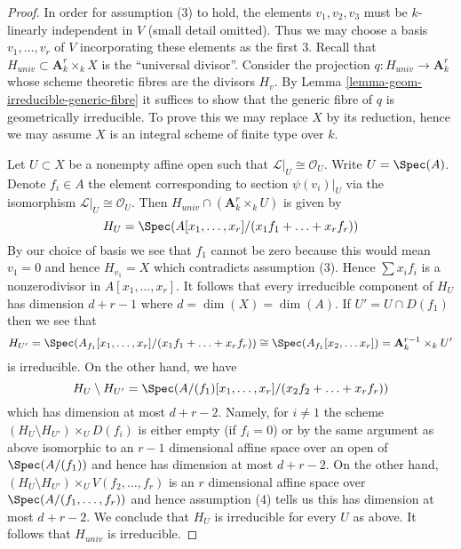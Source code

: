 \begin{proof}
In order for assumption (3) to hold, the elements $v_1, v_2, v_3$
must be $k$-linearly independent in $V$ (small detail omitted).
Thus we may choose a basis $v_1, \ldots, v_r$ of $V$ incorporating
these elements as the first $3$. Recall that
$H_{univ} \subset \mathbf{A}^r_k \times_k X$ is the ``universal divisor''.
Consider the projection $q : H_{univ} \to \mathbf{A}^r_k$
whose scheme theoretic fibres are the divisors $H_v$. By
Lemma \ref{lemma-geom-irreducible-generic-fibre}
it suffices to show that the generic fibre of $q$ is geometrically
irreducible.
To prove this we may replace $X$ by its reduction, hence
we may assume $X$ is an integral scheme of finite type over $k$.

\medskip\noindent
Let $U \subset X$ be a nonempty affine open such that
$\mathcal{L}|_U \cong \mathcal{O}_U$. Write $U = \Spec(A)$.
Denote $f_i \in A$ the element corresponding to section $\psi(v_i)|_U$
via the isomorphism $\mathcal{L}|_U \cong \mathcal{O}_U$.
Then $H_{univ} \cap (\mathbf{A}^r_k \times_k U)$ is given by
$$
H_U = \Spec(A[x_1, \ldots, x_r]/(x_1f_1 + \ldots + x_rf_r))
$$
By our choice of basis we see that $f_1$ cannot be zero because this
would mean $v_1 = 0$ and hence $H_{v_1} = X$ which contradicts
assumption (3). Hence $\sum x_if_i$ is a nonzerodivisor in
$A[x_1, \ldots, x_r]$.
It follows that every irreducible component of $H_U$ has dimension
$d + r - 1$ where $d = \dim(X) = \dim(A)$. If $U' = U \cap D(f_1)$
then we see that
$$
H_{U'} =
\Spec(A_{f_1}[x_1, \ldots, x_r]/(x_1f_1 + \ldots + x_rf_r)) \cong
\Spec(A_{f_1}[x_2, \ldots x_r]) =
\mathbf{A}^{r - 1}_k \times_k U'
$$
is irreducible. On the other hand, we have
$$
H_U \setminus H_{U'} =
\Spec(A/(f_1)[x_1, \ldots, x_r]/(x_2f_2 + \ldots + x_rf_r))
$$
which has dimension at most $d + r - 2$. Namely, for $i \not = 1$
the scheme $(H_U \setminus H_{U'}) \times_U D(f_i)$ is either empty
(if $f_i = 0$) or by the same argument as above isomorphic to an $r - 1$
dimensional affine space over an open of $\Spec(A/(f_1))$ and hence has
dimension at most $d + r - 2$.
On the other hand, $(H_U \setminus H_{U'}) \times_U V(f_2, \ldots, f_r)$
is an $r$ dimensional affine space over $\Spec(A/(f_1, \ldots, f_r))$
and hence assumption (4) tells us this has dimension at most
$d + r - 2$. We conclude that $H_U$ is irreducible for every $U$ as above.
It follows that $H_{univ}$ is irreducible.


\end{proof}
